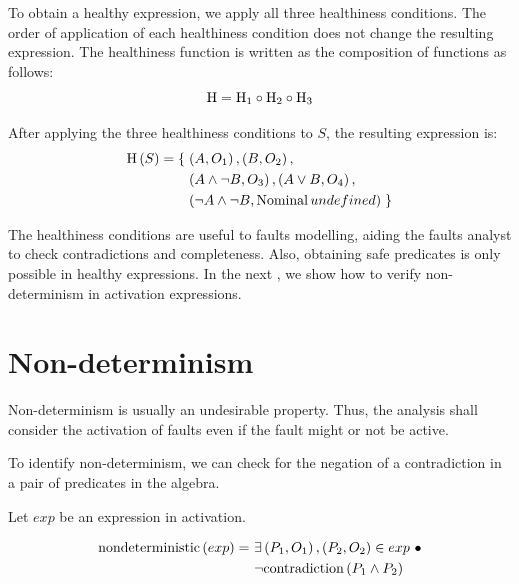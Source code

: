 To obtain a healthy expression, we apply all three healthiness conditions.
The order of application of each healthiness condition does not change the resulting expression.
The healthiness function is written as the composition of functions as follows:
\begin{equation}
\label{eq:h}
\healthiness = \healthiness[1] \circ \healthiness[2] \circ \healthiness[3]\end{equation}

After applying the three healthiness conditions to $S$, the resulting expression is:
\[
\begin{split}
\healthinessfun{S} = \left\{\right.
  & \left(A, O_1\right), \left(B, O_2\right),\\
  & \left(A \land \lnot B, O_3\right), \left(A \lor B, O_4\right),\\
  & \left(\lnot A \land \lnot B, \Nominal{undefined}\right)
\left.\right\}
\end{split}
\]

The healthiness conditions are useful to faults modelling, aiding the faults analyst to check contradictions and completeness.
Also, obtaining safe predicates is only possible in healthy expressions.
In the next , we show how to verify non-determinism in \ac{activation} expressions.


\section{Non-determinism}
\label{sec:non-determinism}

Non-determinism is usually an undesirable property.
Thus, the analysis shall consider the activation of faults even if the fault might or not be active.

To identify non-determinism, we can check for the negation of a contradiction in a pair of predicates in the algebra.

\begin{definition}
\label{def:non-determinism}
Let $exp$ be an expression in \ac{activation}.

\begin{equation}
\label{eq:non-determinism}
\begin{split}
\mathrm{nondeterministic}\left(exp\right) = &~ \exists \left(P_1,O_1\right),\left(P_2, O_2\right) \in exp~\bullet \\
  &~ \lnot \mathrm{contradiction}\left(P_1 \land P_2\right)
\end{split}
\end{equation}

\end{definition}

